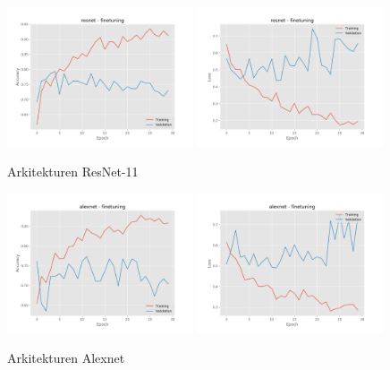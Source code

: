 \documentclass{kththesis}
\begin{document}
  \begin{figure}
    \centering
    \includegraphics[width=0.49\textwidth]{"./fireplace/fireplace-classification - acc - resnet - finetuning"}
    \includegraphics[width=0.49\textwidth]{"./fireplace/fireplace-classification - loss - resnet - finetuning"}
    \caption{Arkitekturen ResNet-11}
  \end{figure}

  \begin{figure}
    \centering
    \includegraphics[width=0.49\textwidth]{"./fireplace/fireplace-classification - acc - alexnet - finetuning"}
    \includegraphics[width=0.49\textwidth]{"./fireplace/fireplace-classification - loss - alexnet - finetuning"}
    \caption{Arkitekturen Alexnet}
  \end{figure}
\end{document}

